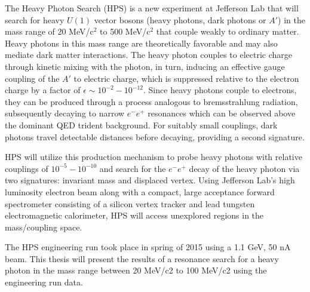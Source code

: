 The Heavy Photon Search (HPS) is a new experiment at Jefferson Lab that will 
search for heavy $U(1)$ vector bosons (heavy photons, dark photons or $A'$)
in the mass range of 20 MeV/c$^{2}$ to 500 MeV/c$^{2}$ that couple weakly to
ordinary matter.  Heavy photons in this mass range are theoretically favorable
and may also mediate dark matter interactions.  The heavy photon couples to 
electric charge through kinetic mixing with the photon, in turn, inducing an 
effective gauge coupling of the $A'$ to electric charge, which is suppressed
relative to the electron charge by a factor of 
$\epsilon \sim 10^{-2} - 10^{-12}$.  Since heavy photons couple to electrons, 
they can be produced through a process analogous to bremsstrahlung radiation, 
subsequently decaying to narrow $e^{-}e^{+}$ resonances which can be observed 
above the dominant QED trident background.  For suitably small couplings, dark
photons travel detectable distances before decaying, providing a second 
signature.

HPS will utilize this production mechanism to probe heavy photons with relative
couplings of $10^{-5} - 10^{-10}$ and search for the $e^{-}e^{+}$ decay of the
heavy photon via two signatures: invariant mass and displaced vertex.  Using 
Jefferson Lab’s high luminosity electron beam along with a compact, large 
acceptance forward spectrometer consisting of a silicon vertex tracker and lead
tungsten electromagnetic calorimeter, HPS will access unexplored regions in the
mass/coupling space. 

The HPS engineering run took place in spring of 2015 using a 1.1 GeV, 50 nA 
beam.  This thesis will present the results of a resonance search for a heavy
photon in the mass range between 20 MeV/c2 to 100 MeV/c2 using the engineering
run data. 
